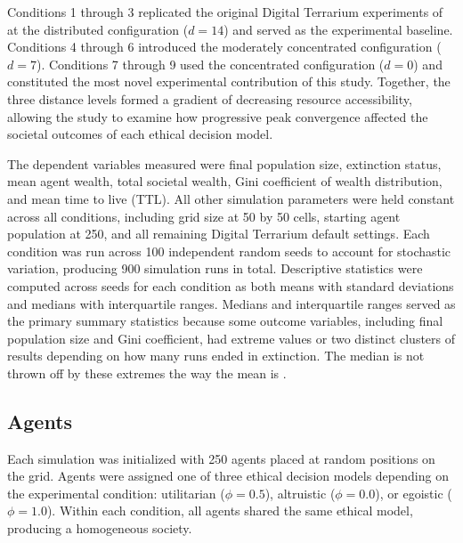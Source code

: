 \documentclass{icsthesis}
\begin{document}
\begin{mainmatter}
				Conditions 1 through 3 replicated the original Digital Terrarium experiments of \citet{KremerHerman2024} at the distributed configuration ($d = 14$) and served as the experimental baseline. Conditions 4 through 6 introduced the moderately concentrated configuration ($d = 7$). Conditions 7 through 9 used the concentrated configuration ($d = 0$) and constituted the most novel experimental contribution of this study. Together, the three distance levels formed a gradient of decreasing resource accessibility, allowing the study to examine how progressive peak convergence affected the societal outcomes of each ethical decision model.

				The dependent variables measured were final population size, extinction status, mean agent wealth, total societal wealth, Gini coefficient of wealth distribution, and mean time to live (TTL). All other simulation parameters were held constant across all conditions, including grid size at 50 by 50 cells, starting agent population at 250, and all remaining Digital Terrarium default settings. Each condition was run across 100 independent random seeds to account for stochastic variation, producing 900 simulation runs in total. Descriptive statistics were computed across seeds for each condition as both means with standard deviations and medians with interquartile ranges. Medians and interquartile ranges served as the primary summary statistics because some outcome variables, including final population size and Gini coefficient, had extreme values or two distinct clusters of results depending on how many runs ended in extinction. The median is not thrown off by these extremes the way the mean is \citep{Field2013}.

			\subsection{Agents}
			Each simulation was initialized with 250 agents placed at random positions on the grid. Agents were assigned one of three ethical decision models depending on the experimental condition: utilitarian ($\phi = 0.5$), altruistic ($\phi = 0.0$), or egoistic ($\phi = 1.0$). Within each condition, all agents shared the same ethical model, producing a homogeneous society.


\end{mainmatter}
\end{document}
